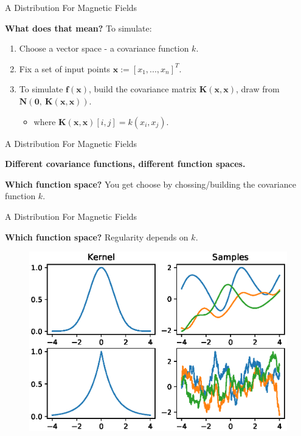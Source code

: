 \documentclass{beamer}
\begin{document}
\begin{frame}{A Distribution For Magnetic Fields}

  \textbf{What does that mean?} To simulate:

  \begin{enumerate}
    \setlength\itemsep{1em}
    \item Choose a vector space - a covariance function $k$.
    \item Fix a set of input points $\mathbf{x} := [x_1, ... , x_n]^T$.
    \item To simulate $\mathbf{f(x)}$, build the covariance matrix $\mathbf{K(x, x)}$, draw from $\mathbf{N\left(0, \ K(x, x)\right)}$.
    \vspace{1em}
    \begin{itemize}
      \item[] where $\mathbf{K(x, x)}[i, j] = k(x_i, x_j).$
    \end{itemize}
  \end{enumerate}

\end{frame}


\begin{frame}{A Distribution For Magnetic Fields}

  \textbf{Different covariance functions, different function spaces.}

  \vspace{1em}

  \textbf{Which function space?} You get choose by chossing/building the covariance function $k$.

\end{frame}



\begin{frame}{A Distribution For Magnetic Fields}

  \textbf{Which function space?} Regularity depends on $k$.

  \begin{figure}
    \includegraphics[width=\linewidth]{plots/regularity.eps}
  \end{figure}

\end{frame}
\end{document}
